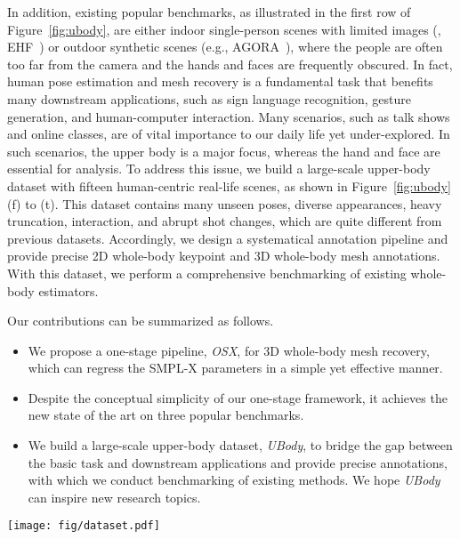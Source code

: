 \documentclass[10pt,twocolumn,letterpaper]{article}
\newcommand{\modelname}{\emph{OSX}\xspace}
\newcommand{\dataname}{\emph{UBody}\xspace}
\begin{document}
In addition, existing popular benchmarks, as illustrated in the first row of Figure~\ref{fig:ubody}, are either indoor single-person scenes with limited images (\eg, EHF~\cite{Pavlakos_2019smplx}) or outdoor synthetic scenes (e.g., AGORA~\cite{Patel_2021agora}), where the people are often too far from the camera and the hands and faces are frequently obscured. 
In fact, human pose estimation and mesh recovery is a fundamental task that benefits many downstream applications, such as sign language recognition, gesture generation, and human-computer interaction.
Many scenarios, such as talk shows and online classes, are of vital importance to our daily life yet under-explored. In such scenarios, the upper body is a major focus, whereas the hand and face are essential for analysis.
To address this issue, we build a large-scale upper-body dataset with fifteen human-centric real-life scenes, as shown in Figure~\ref{fig:ubody}(f) to (t). This dataset contains many unseen poses, diverse appearances, heavy truncation, interaction, and abrupt shot changes, which are quite different from previous datasets. Accordingly, we design a systematical annotation pipeline and provide precise 2D whole-body keypoint and 3D whole-body mesh annotations. With this dataset, we perform a comprehensive benchmarking of existing whole-body estimators. 

Our contributions can be summarized as follows.
\begin{itemize}
\vspace{-0.1cm}
\item We propose a one-stage pipeline, \modelname, for 3D whole-body mesh recovery, which can regress the SMPL-X parameters in a simple yet effective manner.
\vspace{-0.2cm}
\item Despite the conceptual simplicity of our one-stage framework, it achieves the new state of the art on three popular benchmarks.
\vspace{-0.2cm}
\item We build a large-scale upper-body dataset, \dataname, to bridge the gap between the basic task and downstream applications and provide precise annotations, with which we conduct benchmarking of existing methods. We hope \dataname can inspire new research topics. 
\end{itemize}

\begin{figure*}[ht]
\begin{center}
\texttt{[image: fig/dataset.pdf]}
\end{center}
\vspace{-0.6cm}
\caption{
Illustration of five previous datasets (from (a) to (e)) and the proposed Upper Body Dataset (from (f) to (t)) with fifteen real-life scenes. \dataname bridges the gap between the basic 3D whole-body estimation task and downstream tasks with highly expressive actions.
}
\label{fig:ubody}
\vspace{-0.6cm}
\end{figure*} \vspace{-0.2cm}
\end{document}
